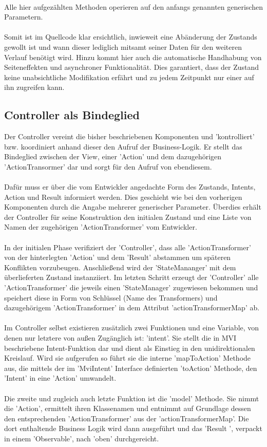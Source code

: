 \\
Alle hier aufgezählten Methoden operieren auf den anfangs genannten generischen Parametern. 
\\\\
Somit ist im Quellcode klar ersichtlich, inwieweit eine Abänderung der Zustands gewollt ist und wann dieser lediglich mitsamt seiner Daten für den weiteren Verlauf benötigt wird. Hinzu kommt hier auch die automatische Handhabung von Seiteneffekten und asynchroner Funktionalität. Dies garantiert, dass der Zustand keine unabsichtliche Modifikation erfährt und zu jedem Zeitpunkt nur einer auf ihn zugreifen kann.

\subsection{Controller als Bindeglied}
Der Controller vereint die bisher beschriebenen Komponenten und 'kontrolliert' bzw. koordiniert anhand dieser den Aufruf der Business-Logik. Er stellt das Bindeglied zwischen der View, einer 'Action' und dem dazugehörigen 'ActionTransormer' dar und sorgt für den Aufruf von ebendiesem. 
\\\\
Dafür muss er über die vom Entwickler angedachte Form des Zustands, Intents, Action und Result informiert werden. Dies geschieht wie bei den vorherigen Komponenten durch die Angabe mehrerer generischer Parameter. Überdies erhält der Controller für seine Konstruktion den initialen Zustand und eine Liste von Namen der zugehörigen 'ActionTransformer' vom Entwickler.
\\\\
In der initialen Phase verifiziert der 'Controller', dass alle 'ActionTransformer' von der hinterlegten 'Action' und dem 'Result' abstammen um späteren Konflikten vorzubeugen. Anschließend wird der 'StateMananger' mit dem überlieferten Zustand instanziiert. Im letzten Schritt erzeugt der 'Controller' alle 'ActionTransformer' die jeweils einen 'StateManager' zugewiesen bekommen und speichert diese in Form von Schlüssel (Name des Transformers) und dazugehörigem 'ActionTransformer' in dem Attribut 'actionTransformerMap' ab.
\\\\
Im Controller selbst existieren zusätzlich zwei Funktionen und eine Variable, von denen nur letztere von außen Zugänglich ist: 'intent'. Sie stellt die in MVI beschriebene Intent-Funktion dar und dient als Einstieg in den unidirektionalen Kreislauf. Wird sie aufgerufen so führt sie die interne 'mapToAction' Methode aus, die mittels der im 'MviIntent' Interface definierten 'toAction' Methode, den 'Intent' in eine 'Action' umwandelt.
\\\\
Die zweite und zugleich auch letzte Funktion ist die 'model' Methode. Sie nimmt die 'Action', ermittelt ihren Klassenamen und entnimmt auf Grundlage dessen den entsprechenden 'ActionTransformer' aus der 'actionTransformerMap'. Die dort enthaltende Business Logik wird dann ausgeführt und das 'Result ', verpackt in einem 'Observable', nach 'oben' durchgereicht.
